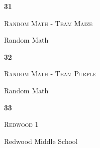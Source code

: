 \documentclass[extrafontsizes,30pt]{memoir}
\begin{document}
\newpage



\renewcommand{\TeamID}{31}
\renewcommand{\TeamName}{Random Math - Team Maize}
\renewcommand{\SchoolName}{Random Math}

\begin{center}
\mbox{}
\vspace{1in}

{\Huge \textbf{ \TeamID}}

\vspace{1in}

{\Large \textsc{\TeamName}}

\vspace{1in}

{\large \SchoolName}
\end{center}

\newpage



\renewcommand{\TeamID}{32}
\renewcommand{\TeamName}{Random Math - Team Purple}
\renewcommand{\SchoolName}{Random Math}

\begin{center}
\mbox{}
\vspace{1in}

{\Huge \textbf{ \TeamID}}

\vspace{1in}

{\Large \textsc{\TeamName}}

\vspace{1in}

{\large \SchoolName}
\end{center}

\newpage



\renewcommand{\TeamID}{33}
\renewcommand{\TeamName}{Redwood 1}
\renewcommand{\SchoolName}{Redwood Middle School}

\begin{center}
\mbox{}
\vspace{1in}

{\Huge \textbf{ \TeamID}}

\vspace{1in}

{\Large \textsc{\TeamName}}

\vspace{1in}

{\large \SchoolName}
\end{center}

\newpage
\end{document}
